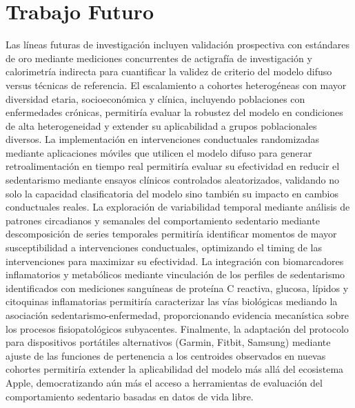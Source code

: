 \section{Trabajo Futuro}
\label{sec:trabajo_futuro}

Las líneas futuras de investigación incluyen validación prospectiva con estándares de oro mediante mediciones concurrentes de actigrafía de investigación y calorimetría indirecta para cuantificar la validez de criterio del modelo difuso versus técnicas de referencia. El escalamiento a cohortes heterogéneas con mayor diversidad etaria, socioeconómica y clínica, incluyendo poblaciones con enfermedades crónicas, permitiría evaluar la robustez del modelo en condiciones de alta heterogeneidad y extender su aplicabilidad a grupos poblacionales diversos. La implementación en intervenciones conductuales randomizadas mediante aplicaciones móviles que utilicen el modelo difuso para generar retroalimentación en tiempo real permitiría evaluar su efectividad en reducir el sedentarismo mediante ensayos clínicos controlados aleatorizados, validando no solo la capacidad clasificatoria del modelo sino también su impacto en cambios conductuales reales. La exploración de variabilidad temporal mediante análisis de patrones circadianos y semanales del comportamiento sedentario mediante descomposición de series temporales permitiría identificar momentos de mayor susceptibilidad a intervenciones conductuales, optimizando el timing de las intervenciones para maximizar su efectividad. La integración con biomarcadores inflamatorios y metabólicos mediante vinculación de los perfiles de sedentarismo identificados con mediciones sanguíneas de proteína C reactiva, glucosa, lípidos y citoquinas inflamatorias permitiría caracterizar las vías biológicas mediando la asociación sedentarismo-enfermedad, proporcionando evidencia mecanística sobre los procesos fisiopatológicos subyacentes. Finalmente, la adaptación del protocolo para dispositivos portátiles alternativos (Garmin, Fitbit, Samsung) mediante ajuste de las funciones de pertenencia a los centroides observados en nuevas cohortes permitiría extender la aplicabilidad del modelo más allá del ecosistema Apple, democratizando aún más el acceso a herramientas de evaluación del comportamiento sedentario basadas en datos de vida libre.
